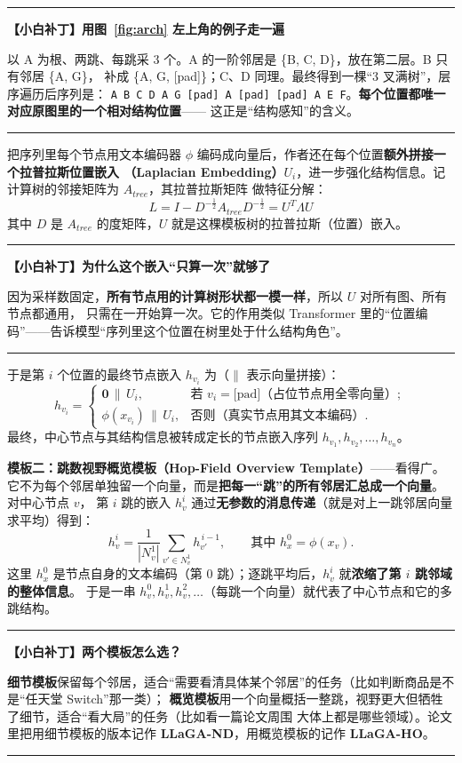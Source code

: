 \documentclass[11pt,UTF8,fontset=fandol]{ctexart}
\newenvironment{tip}[1]{%
  \par\smallskip\noindent\rule{\linewidth}{0.4pt}\par\nobreak
  \noindent\textbf{【小白补丁】#1}\par\nobreak\noindent\ignorespaces
}{%
  \par\noindent\rule{\linewidth}{0.4pt}\par\smallskip
}
\begin{document}
\begin{tip}{用图~\ref{fig:arch} 左上角的例子走一遍}
以 A 为根、两跳、每跳采 3 个。A 的一阶邻居是 \{B, C, D\}，放在第二层。B 只有邻居 \{A, G\}，
补成 \{A, G, [pad]\}；C、D 同理。最终得到一棵“3 叉满树”，层序遍历后序列是：
\texttt{A B C D A G [pad] A [pad] [pad] A E F}。\textbf{每个位置都唯一对应原图里的一个相对结构位置}——
这正是“结构感知”的含义。
\end{tip}

把序列里每个节点用文本编码器 $\phi$ 编码成向量后，作者还在每个位置\textbf{额外拼接一个拉普拉斯位置嵌入
（Laplacian Embedding）}$U_i$，进一步强化结构信息。记计算树的邻接矩阵为 $A_{tree}$，其拉普拉斯矩阵
做特征分解：
\begin{equation*}
  L = I - D^{-\frac{1}{2}} A_{tree} D^{-\frac{1}{2}} = U^{T}\Lambda U \tag{1}
\end{equation*}
其中 $D$ 是 $A_{tree}$ 的度矩阵，$U$ 就是这棵模板树的拉普拉斯（位置）嵌入。
\begin{tip}{为什么这个嵌入“只算一次”就够了}
因为采样数固定，\textbf{所有节点用的计算树形状都一模一样}，所以 $U$ 对所有图、所有节点都通用，
只需在一开始算一次。它的作用类似 Transformer 里的“位置编码”——告诉模型“序列里这个位置在树里处于什么结构角色”。
\end{tip}
于是第 $i$ 个位置的最终节点嵌入 $h_{v_i}$ 为（$\|$ 表示向量拼接）：
\begin{equation*}
  h_{v_i} =
  \begin{cases}
    \mathbf{0} \,\|\, U_i, & \text{若 } v_i = \text{[pad]（占位节点用全零向量）};\\
    \phi(x_{v_i}) \,\|\, U_i, & \text{否则（真实节点用其文本编码）}.
  \end{cases}\tag{2}
\end{equation*}
最终，中心节点与其结构信息被转成定长的节点嵌入序列 $h_{v_1}, h_{v_2}, \dots, h_{v_n}$。

\textbf{模板二：跳数视野概览模板（Hop-Field Overview Template）}——看得广。
它不为每个邻居单独留一个向量，而是\textbf{把每一“跳”的所有邻居汇总成一个向量}。对中心节点 $v$，
第 $i$ 跳的嵌入 $h_v^{i}$ 通过\textbf{无参数的消息传递}（就是对上一跳邻居向量求平均）得到：
\begin{equation*}
  h_v^{i} = \frac{1}{|N_v^{1}|}\sum_{v' \in N_v^{1}} h_{v'}^{\,i-1},
  \qquad\text{其中 } h_x^{0} = \phi(x_v).\tag{3}
\end{equation*}
这里 $h_x^0$ 是节点自身的文本编码（第 0 跳）；逐跳平均后，$h_v^{i}$ 就\textbf{浓缩了第 $i$ 跳邻域的整体信息}。
于是一串 $h_v^0, h_v^1, h_v^2,\dots$（每跳一个向量）就代表了中心节点和它的多跳结构。
\begin{tip}{两个模板怎么选？}
\textbf{细节模板}保留每个邻居，适合“需要看清具体某个邻居”的任务（比如判断商品是不是“任天堂 Switch”那一类）；
\textbf{概览模板}用一个向量概括一整跳，视野更大但牺牲了细节，适合“看大局”的任务（比如看一篇论文周围
大体上都是哪些领域）。论文里把用细节模板的版本记作 \textbf{LLaGA-ND}，用概览模板的记作 \textbf{LLaGA-HO}。
\end{tip}
\end{document}
